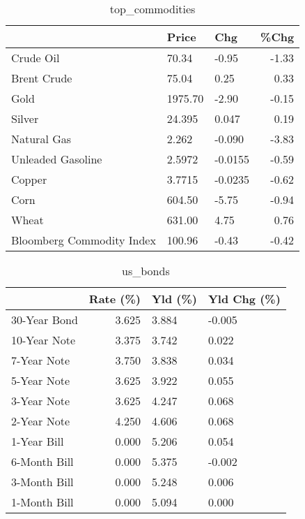 \documentclass{article}%
\begin{document}
\begin{table}[htbp]%
\caption{top\_commodities}%
\centering%
\begin{adjustbox}{width=1\textwidth}%
\begin{tabular}{lllr}
\toprule
                          &   Price &     Chg &  \%Chg \\
\midrule
               Crude Oil  &   70.34 &   -0.95 & -1.33 \\
             Brent Crude  &   75.04 &    0.25 &  0.33 \\
                    Gold  & 1975.70 &   -2.90 & -0.15 \\
                  Silver  &  24.395 &   0.047 &  0.19 \\
             Natural Gas  &   2.262 &  -0.090 & -3.83 \\
       Unleaded Gasoline  &  2.5972 & -0.0155 & -0.59 \\
                  Copper  &  3.7715 & -0.0235 & -0.62 \\
                    Corn  &  604.50 &   -5.75 & -0.94 \\
                   Wheat  &  631.00 &    4.75 &  0.76 \\
Bloomberg Commodity Index &  100.96 &   -0.43 & -0.42 \\
\bottomrule
\end{tabular}
%
\end{adjustbox}%
\end{table}

%


\begin{table}[htbp]%
\caption{us\_bonds}%
\centering%
\begin{adjustbox}{width=1\textwidth}%
\begin{tabular}{lrll}
\toprule
             &  Rate (\%) & Yld (\%) & Yld Chg (\%) \\
\midrule
30-Year Bond &     3.625 &   3.884 &      -0.005 \\
10-Year Note &     3.375 &   3.742 &       0.022 \\
 7-Year Note &     3.750 &   3.838 &       0.034 \\
 5-Year Note &     3.625 &   3.922 &       0.055 \\
 3-Year Note &     3.625 &   4.247 &       0.068 \\
 2-Year Note &     4.250 &   4.606 &       0.068 \\
 1-Year Bill &     0.000 &   5.206 &       0.054 \\
6-Month Bill &     0.000 &   5.375 &      -0.002 \\
3-Month Bill &     0.000 &   5.248 &       0.006 \\
1-Month Bill &     0.000 &   5.094 &       0.000 \\
\bottomrule
\end{tabular}
%
\end{adjustbox}%
\end{table}
\end{document}
